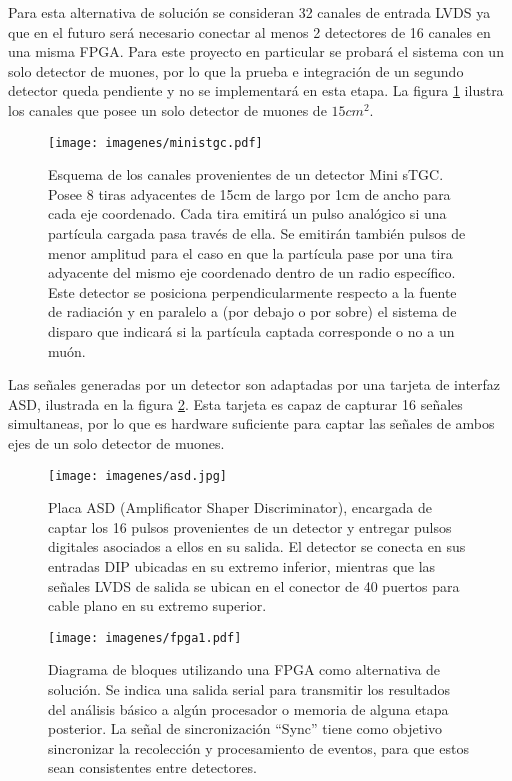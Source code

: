 \par Para esta alternativa de solución se consideran 32 canales de entrada LVDS ya que en el futuro será necesario conectar al menos 2 detectores de 16 canales en una misma FPGA. Para este proyecto en particular se probará el sistema con un solo detector de muones, por lo que la prueba e integración de un segundo detector queda pendiente y no se implementará en esta etapa. La figura \ref{fig:ministgc} ilustra los canales que posee un solo detector de muones de $15cm^2$.

\begin{figure}[H]
    \centering
    \texttt{[image: imagenes/ministgc.pdf]}
    \caption{Esquema de los canales provenientes de un detector Mini sTGC. Posee 8 tiras adyacentes de 15cm de largo por 1cm de ancho para cada eje coordenado. Cada tira emitirá un pulso analógico si una partícula cargada pasa través de ella. Se emitirán también pulsos de menor amplitud para el caso en que la partícula pase por una tira adyacente del mismo eje coordenado dentro de un radio específico. Este detector se posiciona perpendicularmente respecto a la fuente de radiación y en paralelo a (por debajo o por sobre) el sistema de disparo que indicará si la partícula captada corresponde o no a un muón. }
    \label{fig:ministgc}
\end{figure}

\par Las señales generadas por un detector son adaptadas por una tarjeta de interfaz ASD\cite{1999ATLASICs}, ilustrada en la figura \ref{fig:asd}. Esta tarjeta es capaz de capturar 16 señales simultaneas, por lo que es hardware suficiente para captar las señales de ambos ejes de un solo detector de muones.

\begin{figure}[H]
    \centering
    \texttt{[image: imagenes/asd.jpg]}
    \caption{Placa ASD\cite{1999ATLASICs} (Amplificator Shaper Discriminator), encargada de captar los 16 pulsos provenientes de un detector y entregar pulsos digitales asociados a ellos en su salida. El detector se conecta en sus entradas DIP ubicadas en su extremo inferior, mientras que las señales LVDS de salida se ubican en el conector de 40 puertos para cable plano en su extremo superior.}
    \label{fig:asd}
\end{figure}

\begin{figure}[H]
    \centering
    \texttt{[image: imagenes/fpga1.pdf]}
    \caption{Diagrama de bloques utilizando una FPGA como alternativa de solución. Se indica una salida serial para transmitir los resultados del análisis básico a algún procesador o memoria de alguna etapa posterior. La señal de sincronización ``Sync'' tiene como objetivo sincronizar la recolección y procesamiento de eventos, para que estos sean consistentes entre detectores.}
    \label{fig:fpga1}
\end{figure}


